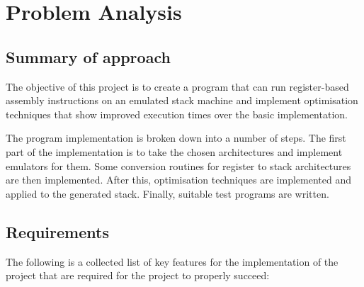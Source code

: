 \chapter{Problem Analysis}\label{ch:problemanalysis}

\section{Summary of approach}
The objective of this project is to create a program that can run
register-based assembly instructions on an emulated stack machine and implement
optimisation techniques that show improved execution times over the basic
implementation.

The program implementation is broken down into a number of steps.  The first
part of the implementation is to take the chosen architectures and implement
emulators for them. Some conversion routines for register to stack architectures
are then implemented. After this, optimisation techniques are implemented and
applied to the generated stack. Finally, suitable test programs are written.

\section{Requirements}
The following is a collected list of key features for the implementation of
the project that are required for the project to properly succeed:

